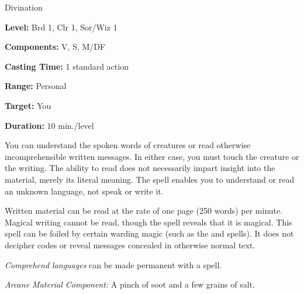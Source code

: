 
Divination

\textbf{Level:} Brd 1, Clr 1, Sor/Wiz 1

\textbf{Components:} V, S, M/DF

\textbf{Casting Time:} 1 standard action

\textbf{Range:} Personal

\textbf{Target:} You

\textbf{Duration:} 10 min./level

You can understand the spoken words of creatures or read otherwise incomprehensible 
written messages. In either case, you must touch the creature or the writing. The 
ability to read does not necessarily impart insight into the material, merely its 
literal meaning. The spell enables you to understand or read an unknown language, 
not speak or write it.

Written material can be read at the rate of one page (250 words) per minute. Magical 
writing cannot be read, though the spell reveals that it is magical. This spell 
can be foiled by certain warding magic (such as the  and  spells). It does not decipher codes or reveal messages concealed in otherwise 
normal text.

\textit{Comprehend languages} can be made permanent with a  spell.

\textit{Arcane Material Component:} A pinch of soot and a few grains of salt.

